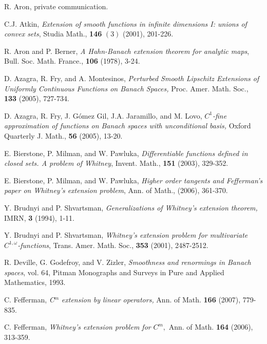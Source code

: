 \documentclass[11pt]{amsproc}%
\theoremstyle{plain}
\numberwithin{equation}{section}
\begin{document}
\begin{thebibliography}{999999}                                                                                           %


R. Aron, private communication.

C.J. Atkin, \textit{Extension of smooth functions in infinite
dimensions I: unions of convex sets}, Studia Math., \textbf{146 }$\left(
3\right)  $ (2001), 201-226.

R. Aron and P. Berner, \textit{A Hahn-Banach extension theorem
for analytic maps}, Bull. Soc. Math. France., \textbf{106 }(1978), 3-24.

D. Azagra, R. Fry, and A. Montesinos, \textit{Perturbed
Smooth Lipschitz Extensions of Uniformly Continuous Functions on Banach
Spaces,} Proc. Amer. Math. Soc., \textbf{133} (2005), 727-734.

D. Azagra, R. Fry, J. G{{\'o}}mez Gil, J.A. Jaramillo,
and M. Lovo, $C^{1}$\textit{-fine approximation of functions on Banach spaces
with unconditional basis, }Oxford Quarterly J. Math., \textbf{56} (2005), 13-20.

E. Bierstone, P. Milman, and W. Pawluka,
\textit{Differentiable functions defined in closed sets. A problem of
Whitney}, Invent. Math., \textbf{151 }(2003), 329-352.

E. Bierstone, P. Milman, and W. Pawluka, \textit{Higher
order tangents and Fefferman's paper on Whitney's extension problem}, Ann. of
Math., (2006), 361-370.

Y. Brudnyi and P. Shvartsman, \textit{Generalizations of
Whitney's extension theorem, }IMRN, \textbf{3 }(1994), 1-11.

Y. Brudnyi and P. Shvartsman, \textit{Whitney's extension
problem for multivariate }$C^{1,\omega}$\textit{-functions}, Trans. Amer.
Math. Soc., \textbf{353 }(2001), 2487-2512.

R. Deville, G. Godefroy, and V. Zizler, \textit{Smoothness
and renormings in Banach spaces}, vol. 64, Pitman Monographs and Surveys in
Pure and Applied Mathematics, 1993.

C. Fefferman, \textit{C}$^{m}$\textit{ extension by linear
operators,} Ann. of Math. \textbf{166 }(2007), 779-835.

C. Fefferman, \textit{Whitney's extension problem for
}$C^{m},$ Ann. of Math. \textbf{164 }(2006), 313-359.


\end{thebibliography}
\end{document}
